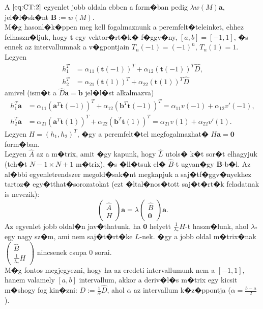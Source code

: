 A $\eqref{eq:CT:2}$ egyenlet jobb oldala ebben a form�ban pedig $\lambda w(M) \mathbf{a}$, jel�l�sk�nt $\textbf{B} := w(M)$. \\
M�g hasonl�k�ppen meg kell fogalmaznunk a peremfelt�teleinket, ehhez felhaszn�ljuk, hogy $\mathbf{t}$ egy vektor�rt�k� f�ggv�ny, $[a, b] = [-1, 1]$, �s ennek az intervallumnak a v�gpontjain $T_n(-1) = (-1)^n$, $T_n(1) = 1$. Legyen
\begin{align*}
h_1^T &= \alpha_{11} (\mathbf{t}(-1))^T + \alpha_{12} (\mathbf{t}(-1))^T \hat{D}, \\
h_2^T &= \alpha_{21} (\mathbf{t}(1))^T + \alpha_{22} (\mathbf{t}(1))^T \hat{D}
\end{align*}
amivel (ism�t a $\hat{D} \mathbf{a} = \mathbf{b}$ jel�l�st alkalmazva)
\begin{align*}
h_1^T \mathbf{a} &= \alpha_{11} (\mathbf{a}^T \mathbf{t}(-1))^T + \alpha_{12} (\mathbf{b}^T \mathbf{t}(-1))^T = \alpha_{11} v(-1) + \alpha_{12} v'(-1), \\
h_2^T \mathbf{a} &= \alpha_{21} (\mathbf{a}^T \mathbf{t}(1))^T + \alpha_{22} (\mathbf{b}^T \mathbf{t}(1))^T = \alpha_{21} v(1) + \alpha_{22} v'(1).
\end{align*}
Legyen $H = (h_1, h_2)^T$, �gy a peremfelt�tel megfogalmazhat� $H \textbf{a} = \textbf{0}$ form�ban. \\
Legyen $\hat{A}$ az a m�trix, amit �gy kapunk, hogy $\hat{L}$ utols� k�t sor�t elhagyjuk (teh�t $N-1 \times N+1$ m�trix), �s �ll�tsuk el� $\hat{B}$-t ugyan�gy $\textbf{B}$-b�l. Az al�bbi egyenletrendszer megold�sak�nt megkapjuk a saj�tf�ggv�nyekhez tartoz� egy�tthat�sorozatokat (ezt �ltal�nos�tott saj�t�rt�k feladatnak is nevezik):
\begin{equation*}
\begin{pmatrix} \hat{A} \\ H \end{pmatrix} \mathbf{a} = \lambda \begin{pmatrix} \hat{B} \\ \mathbf{0} \end{pmatrix} \mathbf{a}.
\end{equation*}
Az egyenlet jobb oldal�n jav�thatunk, ha $\mathbf{0}$ helyett $\frac{1}{\lambda_*} H$-t haszn�lunk, ahol $\lambda_*$ egy nagy sz�m, ami nem saj�t�rt�ke $L$-nek. �gy a jobb oldal m�trix�nak
$\begin{pmatrix} \hat{B} \\ \frac{1}{\lambda_*} H \end{pmatrix}$
nincsenek csupa $0$ sorai. \\
M�g fontos megjegyezni, hogy ha az eredeti intervallumunk nem a $[-1, 1]$, hanem valamely $[a, b]$ intervallum, akkor a deriv�l�s m�trix egy kicsit m�shogy fog kin�zni: $D := \frac{1}{\alpha} \hat{D}$, ahol $\alpha$ az intervallum k�z�ppontja ($\alpha = \frac{b - a}{2}$).

